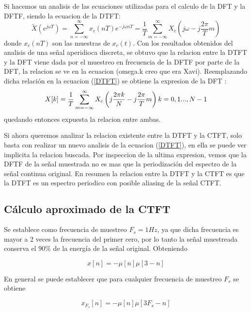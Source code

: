 \documentclass[11pt,a4paper]{article}
\begin{document}
Si hacemos un analisis de las ecuaciones utilizadas para el calculo de la DFT y la DFTF, siendo la ecuacion de la DTFT: 
\begin{equation}
    \label{DTFT}
	\tilde{X}(e^{j \omega T}) = \sum_{n=- \infty}^{\infty} x_{c}(nT) e^{-j \omega nT}=\frac{1}{T}\sum_{m=- \infty}^{\infty} X_{c} \left(j \omega - j \frac{2 \pi}{T}	m \right)	
\end{equation}
 donde $x_{c}(nT)$ son las muestras de $x_{c}(t)$.
 Con los resultados obtenidos del analisis de una señal aperidioca discreta, se obtuvo que la relacion entre la DTFT y la DFT viene dada por el muestreo en frecuencia de la DFTF por parte de la DFT, la relacion
se ve en la ecuacion (omega.k creo que era Xavi). Reemplazando dicha relación en la ecuacion (\ref{DTFT}) se obtiene la expresion de la DFT :
 \begin{equation}
 X[k] = \frac{1}{T}\sum_{m=- \infty}^{\infty} X_{c} \left(j \frac{2 \pi k }{N} - j \frac{2 \pi}{T}	m \right)    k =0,1..., N-1 \\
 \end{equation}
 quedando entonces expuesta la relacion entre ambas.
 
 Si ahora queremos analizar la relacion existente entre la DTFT y la CTFT, solo basta con realizar un nuevo analisis de la ecuacion (\ref{DTFT}), en ella se puede ver implicita la relacion buscada.
 Por inspeccion de la ultima expresion, vemos que la DFTF de la señal muestrada no es mas que la periodización del espectro de la señal continua original.
 En resumen la relacion entre la DTFT y la CTFT es que la DTFT es un espectro periodico con posible aliasing de la señal CTFT.
 
 \subsection{ Cálculo aproximado de la CTFT}

Se establece como frecuencia de muestreo $F_s=1Hz$, ya que dicha frecuencia es mayor a 2 veces la frecuencia del primer cero, por lo tanto la señal
muestreada conserva el $90\%$ de la energía de la señal original. Obteniendo 

\begin{equation}
    x[n]=-\mu[n]\mu[3-n]
\end{equation}

En general se puede establecer que para cualquier frecuencia de muestreo $F_s$ se obtiene 

\begin{equation}
    x_{F_s}[n]=-\mu[n]\mu[3F_s-n]
\end{equation}
\end{document}
